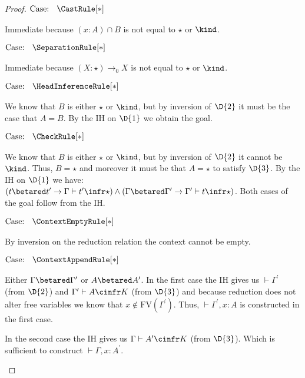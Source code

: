 \begin{proof}
$\text{Case: }\begin{array}{c} \CastRule[*] \end{array}$
\begin{proofcase}
    Immediate because $(x : A) \cap B$ is not equal to $\star$ or $\kind$.
\end{proofcase}

$\text{Case: }\begin{array}{c} \SeparationRule[*] \end{array}$
\begin{proofcase}
    Immediate because $(X : \star) \to_0 X$ is not equal to $\star$ or $\kind$.
\end{proofcase}

$\text{Case: }\begin{array}{c} \HeadInferenceRule[*] \end{array}$
\begin{proofcase}
    We know that $B$ is either $\star$ or $\kind$, but by inversion of $\D{2}$ it must be the case that $A = B$.
    By the IH on $\D{1}$ we obtain the goal.
\end{proofcase}

$\text{Case: }\begin{array}{c} \CheckRule[*] \end{array}$
\begin{proofcase}
    We know that $B$ is either $\star$ or $\kind$, but by inversion of $\D{2}$ it cannot be $\kind$.
    Thus, $B = \star$ and moreover it must be that $A = \star$ to satisfy $\D{3}$.
    By the IH on $\D{1}$ we have:
    $(t \betared t^\prime \to \Gamma \vdash t^\prime \infr \star) \wedge (\Gamma \betared \Gamma^\prime \to \Gamma^\prime \vdash t \infr \star)$.
    Both cases of the goal follow from the IH.
\end{proofcase}

$\text{Case: }\begin{array}{c} \ContextEmptyRule[*] \end{array}$
\begin{proofcase}
    By inversion on the reduction relation the context cannot be empty.
\end{proofcase}

$\text{Case: }\begin{array}{c} \ContextAppendRule[*] \end{array}$
\begin{proofcase}
    Either $\Gamma \betared \Gamma^\prime$ or $A \betared A^\prime$.
    In the first case the IH gives us $\vdash \Gamma^\prime$ (from $\D{2}$) and $\Gamma^\prime \vdash A \cinfr K$ (from $\D{3}$) and because reduction does not alter free variables we know that $x \notin \text{FV}(\Gamma^\prime)$.
    Thus, $\vdash \Gamma^\prime, x : A$ is constructed in the first case.

    In the second case the IH gives us $\Gamma \vdash A^\prime \cinfr K$ (from $\D{3}$).
    Which is sufficient to construct $\vdash \Gamma, x : A^\prime$.
\end{proofcase}
\end{proof}
